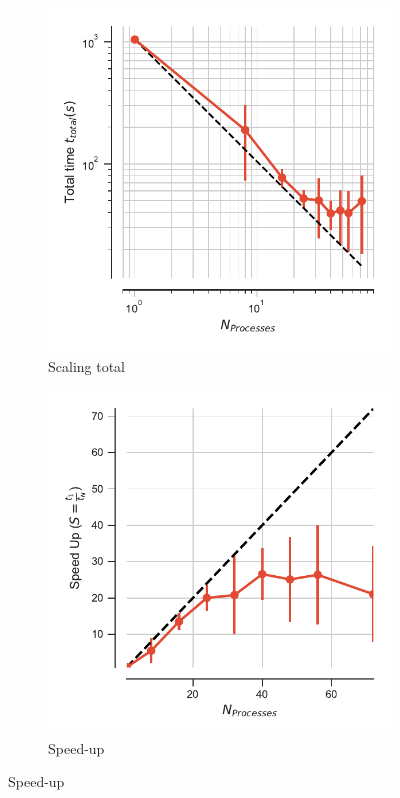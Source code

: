 \begin{figure}[ht!]
\centering
\begin{subfigure}{.4\textwidth}
  \includegraphics[width=\linewidth]{figures/RMSD-ga4py-t_total.pdf}
  \captionsetup{format=hang}
  \caption{Scaling total}
  \label{fig:MPIscaling-ga4py}
\end{subfigure}
\hfill
\begin{subfigure}{.4\textwidth}
  \includegraphics[width=\linewidth]{figures/RMSD-ga4py-speed_up.pdf}
  \captionsetup{format=hang}
  \caption{Speed-up}
  \label{fig:MPIspeedup-ga4py}
\end{subfigure}
\bigskip


\end{figure}
